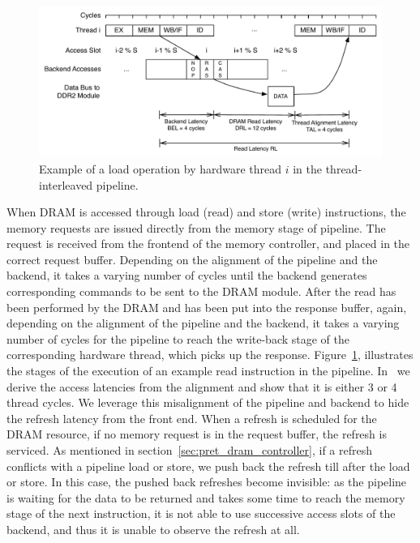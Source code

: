 \begin{figure}
  \vspace{-25pt}
  \begin{center}
  \includegraphics[scale=.38]{figs/readlatency}
  \end{center}
  \vspace{-20pt}
  \caption{\small{Example of a load operation by hardware thread $i$ in the thread-interleaved pipeline.}}
  \label{fig:readlatencyderivation}
\end{figure}
When DRAM is accessed through load (read) and store (write) instructions, the memory requests are issued directly from the memory stage of pipeline.
The request is received from the frontend of the memory controller, and placed in the correct request buffer. 
Depending on the alignment of the pipeline and the backend, it takes a varying number of cycles until the backend generates corresponding commands to be sent to the DRAM module.
After the read has been performed by the DRAM and has been put into the response buffer, again, depending on the alignment of the pipeline and the backend, it takes a varying number of cycles for the pipeline to reach the write-back stage of the corresponding hardware thread, which picks up the response. 
Figure~\ref{fig:readlatencyderivation}, illustrates the stages of the execution of an example read instruction in the pipeline.
In~\cite{ReinekeLiuPatelKimLee11_PRETDRAMControllerBankPrivatizationForPredictability} we derive the access latencies from the alignment and show that it is either 3 or 4 thread cycles.    
We leverage this misalignment of the pipeline and backend to hide the refresh latency from the front end. 
When a refresh is scheduled for the DRAM resource, if no memory request is in the request buffer, the refresh is serviced.
As mentioned in section~\ref{sec:pret_dram_controller}, if a refresh conflicts with a pipeline load or store, we push back the refresh till after the load or store. 
In this case, the pushed back refreshes become invisible:   
as the pipeline is waiting for the data to be returned and takes some time to reach the memory stage of the next instruction, it is not able to use successive access slots of the backend, and thus it is unable to observe the refresh at all.

